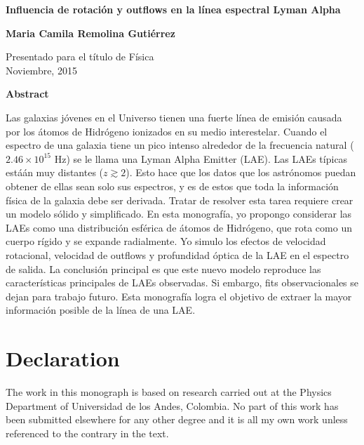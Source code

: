 \newpage
\thispagestyle{empty}
\begin{center}
  \textbf{\Large Influencia de rotaci\'on y outflows en la l\'inea espectral Lyman Alpha}

  \vspace*{1cm}
  \textbf{\large Maria Camila Remolina Guti\'errez}

  \vspace*{0.5cm}
  {\large Presentado para el t\'itulo de Física\\ Noviembre, 2015}

  \vspace*{1cm}
  \textbf{\large Abstract}
\end{center}
Las galaxias j\'ovenes en el Universo tienen una fuerte l\'inea de emisi\'on \lya causada por los \'atomos de Hidr\'ogeno ionizados en su medio interestelar. Cuando el espectro de una galaxia tiene un pico intenso alrededor de la frecuencia natural \lya ($2.46\times 10^{15}$ Hz) se le llama una Lyman Alpha Emitter (LAE). Las LAEs t\'ipicas está\'an muy distantes ($z \gtrsim 2$). Esto hace que los datos que los astr\'onomos puedan obtener de ellas sean solo sus espectros, y es de estos que toda la información f\'isica de la galaxia debe ser derivada. Tratar de resolver esta tarea requiere crear un modelo s\'olido y simplificado. En esta monograf\'ia, yo propongo considerar las LAEs como una distribuci\'on esf\'erica de \'atomos de Hidr\'ogeno, que rota como un cuerpo r\'igido y se expande radialmente. Yo simulo los efectos de velocidad rotacional, velocidad de outflows y profundidad \'optica de la LAE en el espectro de salida. La conclusi\'on principal es que este nuevo modelo reproduce las caracter\'isticas principales de LAEs observadas. Si embargo, fits observacionales se dejan para trabajo futuro. Esta monograf\'ia logra el objetivo de extraer la mayor informaci\'on posible de la l\'inea \lya de una LAE.\\ 
 

\chapter*{Declaration}
The work in this monograph is based on research carried out at the Physics Department of Universidad de los Andes, Colombia. No part of this work has been submitted elsewhere for any other degree and it is all my own work unless referenced to the contrary in the text. 


